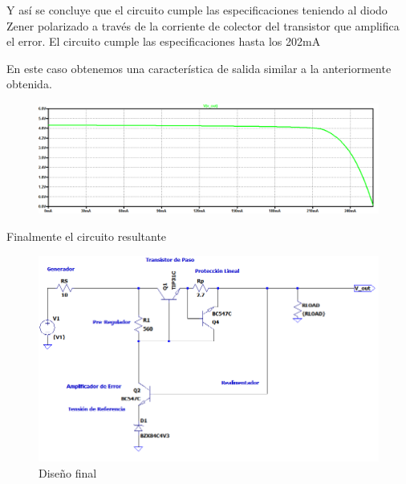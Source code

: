 Y así se concluye que el circuito cumple las especificaciones teniendo al diodo Zener polarizado a través
de la corriente de colector del transistor que amplifica el error.
El circuito cumple las especificaciones hasta los 202mA

En este caso obtenemos una característica de salida similar a la anteriormente obtenida.
\begin{figure}[H]
	\centering
	\includegraphics[width=\linewidth]{ImagenesEjercicio1/CaracteristicaDeSalidaConGrillaFL}
	\caption{}
	\label{fig:caracteristicadesalidacongrillafl}
\end{figure} 
Finalmente el circuito resultante
\begin{figure}[H]
	\centering
	\includegraphics[width=0.7\linewidth]{ImagenesEjercicio1/ImagenCircuitoFL}
	\caption{Diseño final}
	\label{fig:imagencircuitofl}
\end{figure}



